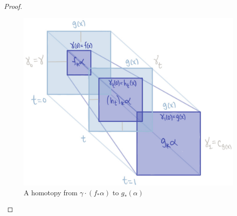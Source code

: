 \documentclass{article}[11pt]
\begin{document}
\begin{proof}
\begin{figure}[h]
  \includegraphics[scale=.15]{pics/homotopy.png}
  \centering
  \caption{A homotopy from $\gamma\cdot (f_\ast \alpha)$ to $g_\ast(\alpha)$}
  \label{homotopypic}
\end{figure}

\end{proof}
\end{document}
